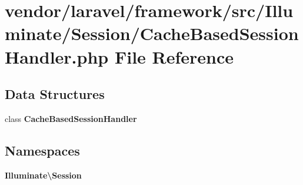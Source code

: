 \section{vendor/laravel/framework/src/\+Illuminate/\+Session/\+Cache\+Based\+Session\+Handler.php File Reference}
\label{_cache_based_session_handler_8php}
\subsection*{Data Structures}
\begin{DoxyCompactItemize}
\item 
class {\bf Cache\+Based\+Session\+Handler}
\end{DoxyCompactItemize}
\subsection*{Namespaces}
\begin{DoxyCompactItemize}
\item 
 {\bf Illuminate\textbackslash{}\+Session}
\end{DoxyCompactItemize}

